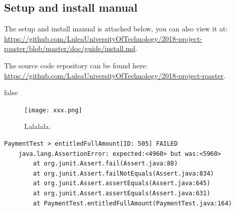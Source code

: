 \documentclass[12pt,a4paper]{report}
\begin{document}
\begin{appendix}
\chapter{Setup and install manual}
The setup and install manual is attached below, you can also view it at: \\ \url{https://github.com/LuleaUniversityOfTechnology/2018-project-roaster/blob/master/doc/guide/install.md}.

The source code repository can be found here: \\ \url{https://github.com/LuleaUniversityOfTechnology/2018-project-roaster}.


\end{appendix}

\if false

\begin{figure}[H]
    \centering
    \texttt{[image: xxx.png]}
    \caption{Lalalala.}
    \label{fig:my_label}
\end{figure}

\begin{verbatim}
PaymentTest > entitledFullAmount[ID: 505] FAILED
    java.lang.AssertionError: expected:<4960> but was:<5960>
        at org.junit.Assert.fail(Assert.java:88)
        at org.junit.Assert.failNotEquals(Assert.java:834)
        at org.junit.Assert.assertEquals(Assert.java:645)
        at org.junit.Assert.assertEquals(Assert.java:631)
        at PaymentTest.entitledFullAmount(PaymentTest.java:164)
\end{verbatim}
\end{document}
